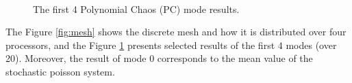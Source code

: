\documentclass{article}
\begin{document}
\begin{figure}
\centering
	\\
\caption{The first 4 Polynomial Chaos (PC) mode results.}
\label{fig:modes}
\end{figure}

The Figure \ref{fig:mesh} shows the discrete mesh and how it is distributed over four processors, and the Figure \ref{fig:modes} presents selected results of the first 4 modes (over 20). Moreover, the result of mode 0 corresponds to the mean value of the stochastic poisson system.



\pagebreak


\pagebreak
{}
{}


\newpage
\appendix




\cleardoublepage
{}
{}
\printindex            %
\end{document}
